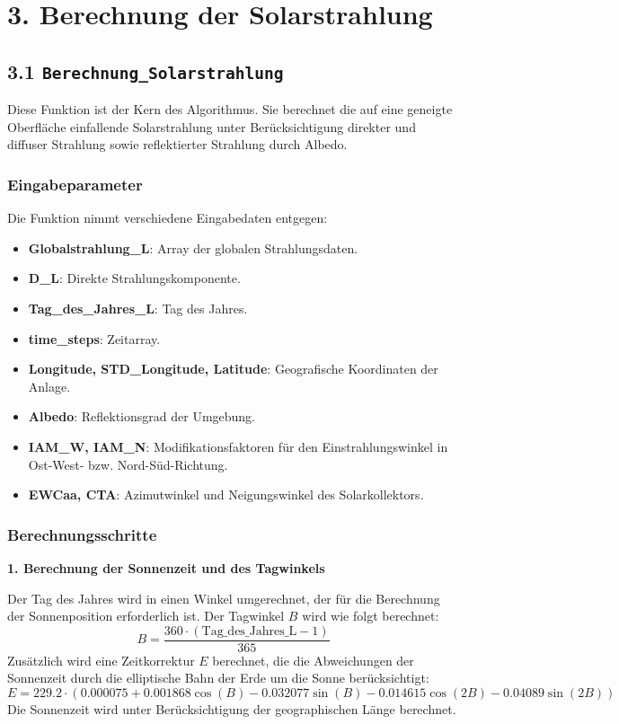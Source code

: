 \documentclass{article}
\begin{document}
\section*{3. Berechnung der Solarstrahlung}

\subsection*{3.1 \texttt{Berechnung\_Solarstrahlung}}

Diese Funktion ist der Kern des Algorithmus. Sie berechnet die auf eine geneigte Oberfläche einfallende Solarstrahlung unter Berücksichtigung direkter und diffuser Strahlung sowie reflektierter Strahlung durch Albedo.

\subsubsection*{Eingabeparameter}

Die Funktion nimmt verschiedene Eingabedaten entgegen:

\begin{itemize}
    \item \textbf{Globalstrahlung\_L}: Array der globalen Strahlungsdaten.
    \item \textbf{D\_L}: Direkte Strahlungskomponente.
    \item \textbf{Tag\_des\_Jahres\_L}: Tag des Jahres.
    \item \textbf{time\_steps}: Zeitarray.
    \item \textbf{Longitude, STD\_Longitude, Latitude}: Geografische Koordinaten der Anlage.
    \item \textbf{Albedo}: Reflektionsgrad der Umgebung.
    \item \textbf{IAM\_W, IAM\_N}: Modifikationsfaktoren für den Einstrahlungswinkel in Ost-West- bzw. Nord-Süd-Richtung.
    \item \textbf{EWCaa, CTA}: Azimutwinkel und Neigungswinkel des Solarkollektors.
\end{itemize}

\subsubsection*{Berechnungsschritte}

\textbf{1. Berechnung der Sonnenzeit und des Tagwinkels}

Der Tag des Jahres wird in einen Winkel umgerechnet, der für die Berechnung der Sonnenposition erforderlich ist. Der Tagwinkel \( B \) wird wie folgt berechnet:
\[
B = \frac{360 \cdot (\text{Tag\_des\_Jahres\_L} - 1)}{365}
\]
Zusätzlich wird eine Zeitkorrektur \( E \) berechnet, die die Abweichungen der Sonnenzeit durch die elliptische Bahn der Erde um die Sonne berücksichtigt:
\[
E = 229.2 \cdot \left( 0.000075 + 0.001868 \cos(B) - 0.032077 \sin(B) - 0.014615 \cos(2B) - 0.04089 \sin(2B) \right)
\]
Die Sonnenzeit wird unter Berücksichtigung der geographischen Länge berechnet.
\end{document}
